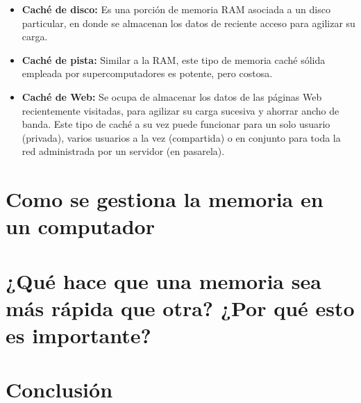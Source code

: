 \documentclass[10pt,letterpaper]{article}
\begin{document}
\begin{justify}
	\begin{itemize}
		
		\item \textbf{Caché de disco:} Es una porción de memoria RAM asociada a un disco particular, en donde se almacenan los datos de reciente acceso para agilizar su carga.\\
		\item \textbf{Caché de pista:} Similar a la RAM, este tipo de memoria caché sólida empleada por supercomputadores es potente, pero costosa.\\
		
		\item \textbf{Caché de Web:} Se ocupa de almacenar los datos de las páginas Web recientemente visitadas, para agilizar su carga sucesiva y ahorrar ancho de banda. Este tipo de caché a su vez puede funcionar para un solo usuario (privada), varios usuarios a la vez (compartida) o en conjunto para toda la red administrada por un servidor (en pasarela).
		
	\end{itemize}
	

\end{justify}


\noindent
\section{Como se gestiona la memoria en un computador} \label{conclusion}

\begin{justify}
	
	
	
\end{justify}


\noindent
\section{¿Qué hace que una memoria sea más rápida que otra? ¿Por qué esto es importante?} \label{conclusion}

\begin{justify}
	
	
	
\end{justify}

\noindent
\section{Conclusión} \label{conclusion}




	

\newpage
\noindent








	
	
	
\end{document}
